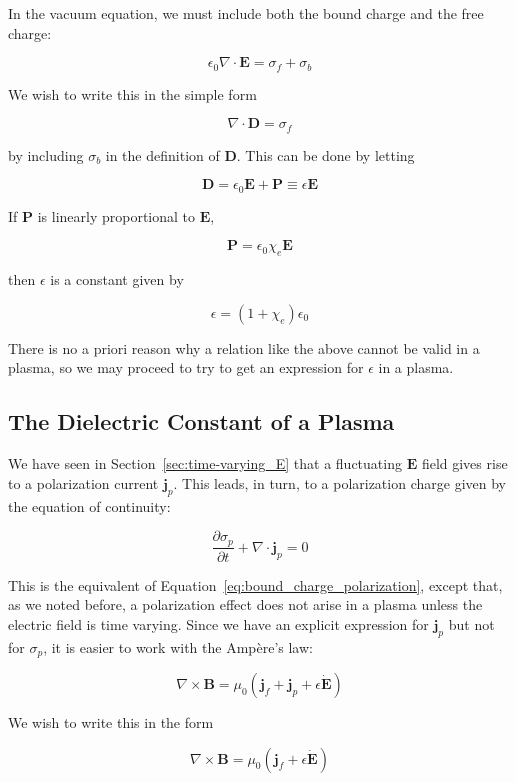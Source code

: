 \documentclass[
  notoc %
]{tufte-book}
\begin{document}
In the vacuum equation, we must include both the bound charge and the
free charge:

\[
\epsilon_0\nabla\cdot\mathbf{E} = \sigma_f + \sigma_b
\]

We wish to write this in the simple form

\[
\nabla\cdot\mathbf{D} = \sigma_f
\]

by including \(\sigma_b\) in the definition of \(\mathbf{D}\). This can
be done by letting

\[
\mathbf{D} = \epsilon_0\mathbf{E} + \mathbf{P} \equiv \epsilon \mathbf{E}
\]

If \(\mathbf{P}\) is linearly proportional to \(\mathbf{E}\),

\[
\mathbf{P} = \epsilon_0 \chi_e\mathbf{E}
\]

then \(\epsilon\) is a constant given by

\[
\epsilon = (1+\chi_e)\epsilon_0
\]

There is no a priori reason why a relation like the above cannot be
valid in a plasma, so we may proceed to try to get an expression for
\(\epsilon\) in a plasma.

\hypertarget{the-dielectric-constant-of-a-plasma}{%
\subsection{The Dielectric Constant of a
Plasma}\label{the-dielectric-constant-of-a-plasma}}

We have seen in Section~\ref{sec:time-varying_E} that a fluctuating
\(\mathbf{E}\) field gives rise to a polarization current
\(\mathbf{j}_p\). This leads, in turn, to a polarization charge given by
the equation of continuity:

\[
\frac{\partial \sigma_p}{\partial t} + \nabla\cdot\mathbf{j}_p = 0
\]

This is the equivalent of Equation~\ref{eq:bound_charge_polarization},
except that, as we noted before, a polarization effect does not arise in
a plasma unless the electric field is time varying. Since we have an
explicit expression for \(\mathbf{j}_p\) but not for \(\sigma_p\), it is
easier to work with the Ampère's law:

\[
\nabla\times\mathbf{B} = \mu_0(\mathbf{j}_f +\mathbf{j}_p + \epsilon\dot{\mathbf{E}})
\]

We wish to write this in the form

\[
\nabla\times\mathbf{B} = \mu_0(\mathbf{j}_f + \epsilon\dot{\mathbf{E}})
\]
\end{document}
